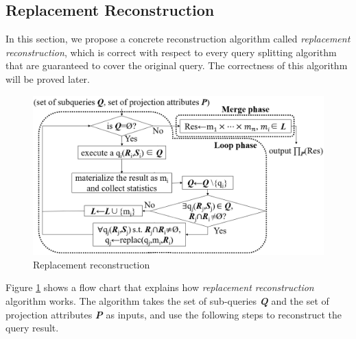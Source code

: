 \subsection{Replacement Reconstruction} \label{S32}
    In this section, we propose a concrete reconstruction algorithm called \textit{replacement reconstruction}, which is correct with respect to every query splitting algorithm that are guaranteed to cover the original query. The correctness of this algorithm will be proved later.
    \begin{figure}[htb]
        \centering
        \includegraphics[width=\linewidth]{./pic/Figure5.png}
        \caption{Replacement reconstruction}
        \label{F5}
        \Description{}
    \end{figure}\par
    Figure \ref{F5} shows a flow chart that explains how \textit{replacement reconstruction} algorithm works. The algorithm takes the set of sub-queries \textbf{\textit{Q}} and the set of projection attributes \textbf{\textit{P}} as inputs, and use the following steps to reconstruct the query result.
